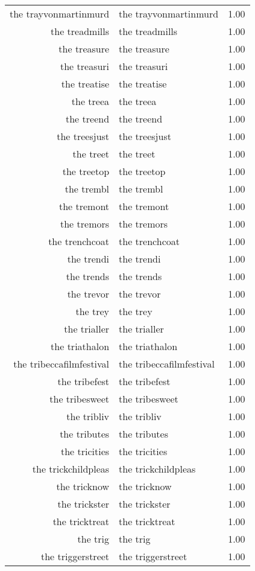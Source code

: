 \begin{table}[ht]
\begin{tabular}{rlr}
  the trayvonmartinmurd & the trayvonmartinmurd & 1.00 \\ 
  the treadmills & the treadmills & 1.00 \\ 
  the treasure & the treasure & 1.00 \\ 
  the treasuri & the treasuri & 1.00 \\ 
  the treatise & the treatise & 1.00 \\ 
  the treea & the treea & 1.00 \\ 
  the treend & the treend & 1.00 \\ 
  the treesjust & the treesjust & 1.00 \\ 
  the treet & the treet & 1.00 \\ 
  the treetop & the treetop & 1.00 \\ 
  the trembl & the trembl & 1.00 \\ 
  the tremont & the tremont & 1.00 \\ 
  the tremors & the tremors & 1.00 \\ 
  the trenchcoat & the trenchcoat & 1.00 \\ 
  the trendi & the trendi & 1.00 \\ 
  the trends & the trends & 1.00 \\ 
  the trevor & the trevor & 1.00 \\ 
  the trey & the trey & 1.00 \\ 
  the trialler & the trialler & 1.00 \\ 
  the triathalon & the triathalon & 1.00 \\ 
  the tribeccafilmfestival & the tribeccafilmfestival & 1.00 \\ 
  the tribefest & the tribefest & 1.00 \\ 
  the tribesweet & the tribesweet & 1.00 \\ 
  the tribliv & the tribliv & 1.00 \\ 
  the tributes & the tributes & 1.00 \\ 
  the tricities & the tricities & 1.00 \\ 
  the trickchildpleas & the trickchildpleas & 1.00 \\ 
  the tricknow & the tricknow & 1.00 \\ 
  the trickster & the trickster & 1.00 \\ 
  the tricktreat & the tricktreat & 1.00 \\ 
  the trig & the trig & 1.00 \\ 
  the triggerstreet & the triggerstreet & 1.00 \\ 

\end{tabular}
\end{table}
